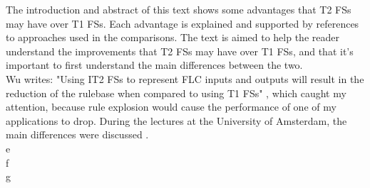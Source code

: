 


The introduction and abstract of this text shows some advantages that T2 FSs may have over T1 FSs. Each advantage is explained and supported by references to approaches used in the comparisons.
The text is aimed to help the reader understand the improvements that T2 FSs may have over T1 FSs, and that it's important to first understand the main differences between the two. \\

Wu writes: "Using IT2 FSs to represent FLC inputs and outputs will result in the reduction of the rulebase when compared to using T1 FSs" \cite{differences_between_it2_and_it1}, which caught my attention, because rule explosion would cause the performance of one of my applications to drop.
During the lectures at the University of Amsterdam, the main differences were discussed \cite{lecture_6_types_of_fl_and_t2_fs}.  \\

e \\

f \\

g
